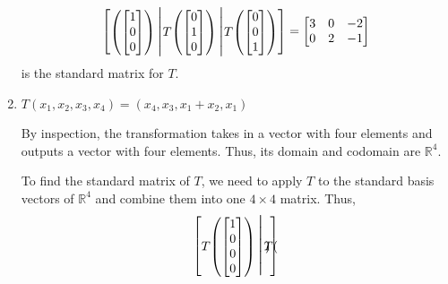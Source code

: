 \documentclass{article}
\begin{document}
\begin{enumerate}
\begin{solution}
\[\begin{bmatrix}
\begin{pmatrix}
\begin{bmatrix}
                        1\\0\\0
                    \end{bmatrix}
                \end{pmatrix}\scalebox{1.3}{\Bigg|}T\!\begin{pmatrix}
                    \begin{bmatrix}
                        0\\1\\0
                    \end{bmatrix}
                \end{pmatrix}\scalebox{1.3}{\Bigg|}T\!\begin{pmatrix}
                    \begin{bmatrix}
                        0\\0\\1
                    \end{bmatrix}
                \end{pmatrix}
            \end{bmatrix} = \begin{bmatrix}
                3&0&-2\\0&2&-1           
            \end{bmatrix} 
        \] is the standard matrix for \(T\).
    \end{solution}
    \item \(T(x_1,x_2,x_3,x_4) = (x_4,x_3,x_1 + x_2,x_1)\)\begin{solution}
        By inspection, the transformation takes in a vector with four elements and outputs a vector with four elements. Thus, its domain and codomain are \(\mathbb{R}^4\).\par
        To find the standard matrix of \(T\), we need to apply \(T\) to the standard basis vectors of \(\mathbb{R}^4\) and combine them into one \(4\times 4\) matrix. Thus,\[
            \begin{bmatrix}
                T\!\begin{pmatrix}
                    \begin{bmatrix}
                        1\\0\\0\\0
                    \end{bmatrix}
                \end{pmatrix}\scalebox{1.6}{\Bigg|}T\!\begin{pmatrix}

\end{pmatrix}
\end{bmatrix}\]
\end{solution}
\end{enumerate}
\end{document}
